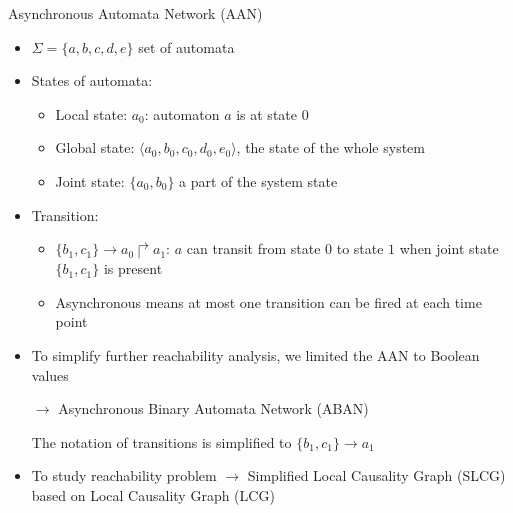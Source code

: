 \documentclass[8pt]{beamer}
\begin{document}
\begin{frame}{Asynchronous Automata Network (AAN)~\cite{folschette2015}}
	
	
	\begin{itemize}
\item<+-> $\Sigma=\{a,b,c,d,e\}$ set of automata 
\item<+-> States of automata: 
\begin{itemize}
    \item<+-> Local state: $a_0$: automaton $a$ is at state $0$
    \item<+-> Global state: $\langle a_0,b_0,c_0,d_0,e_0 \rangle$, the state of the whole system
    \item<+-> Joint state: $\{a_0,b_0\}$ a part of the system state 
\end{itemize}
 
\item<+-> Transition:
\begin{itemize}
    \item<+-> $\{b_1,c_1\}\to a_0\Rsh a_1$: $a$ can transit from state $0$ to state $1$ when joint state $\{b_1,c_1\}$ is present
    \item<+-> Asynchronous means at most one transition can be fired at each time point
\end{itemize}


\item<+-> To simplify further reachability analysis, we limited the AAN to Boolean values
	
	$\to$ Asynchronous Binary Automata Network (ABAN)
    
    The notation of transitions is simplified to $\{b_1,c_1\}\to a_1$
\item<+-> To study reachability problem $\to$ Simplified Local Causality Graph (SLCG) based on Local Causality Graph (LCG)~\cite{pauleve2012}
\end{itemize}
	
\end{frame}
\end{document}
